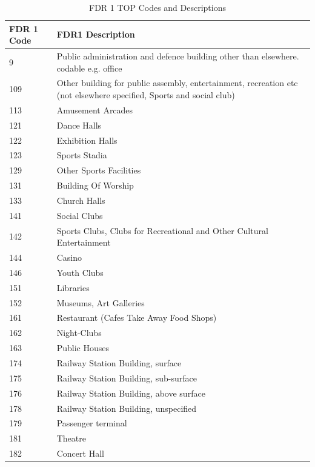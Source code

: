 \documentclass[table,a4paper,oneside]{book}
\begin{document}
\begin{singlespace}
\newpage

\begin{longtable}{|l|p{11cm}|}

\caption{FDR 1 TOP Codes and Descriptions} \label{tab:TOP_Codes} \\
\hline
\textbf{FDR 1 Code}	& \textbf{FDR1 Description}\\
\hline
\endhead

\hline
\endfoot
\rowcolor{lightgray} 9	&Public administration and defence building other than elsewhere. codable e.g. office	\\
109	&Other building for public assembly, entertainment, recreation etc (not elsewhere specified, Sports and social club)	\\
\rowcolor{lightgray} 113	&Amusement Arcades	\\
121	&Dance Halls	\\
\rowcolor{lightgray} 122	&Exhibition Halls	\\
123	&Sports Stadia	\\
\rowcolor{lightgray} 129	&Other Sports Facilities\\
131	&Building Of Worship	\\
\rowcolor{lightgray} 133	&Church Halls	\\
141	&Social Clubs	\\
\rowcolor{lightgray} 142	&Sports Clubs, Clubs for Recreational and Other Cultural Entertainment	\\
144	&Casino	\\
\rowcolor{lightgray} 146	&Youth Clubs	\\
151	&Libraries	\\
\rowcolor{lightgray} 152	&Museums, Art Galleries	\\
161	&Restaurant (Cafes Take Away Food Shops)\\
\rowcolor{lightgray} 162	&Night-Clubs	\\
163	&Public Houses	\\
\rowcolor{lightgray} 174	&Railway Station Building, surface	\\
175	&Railway Station Building, sub-surface	\\
\rowcolor{lightgray} 176	&Railway Station Building, above surface\\
178	&Railway Station Building, unspecified	\\
\rowcolor{lightgray} 179	&Passenger terminal	\\
181	&Theatre	\\
\rowcolor{lightgray} 182	&Concert Hall	\\

\end{longtable}
\end{singlespace}
\end{document}
